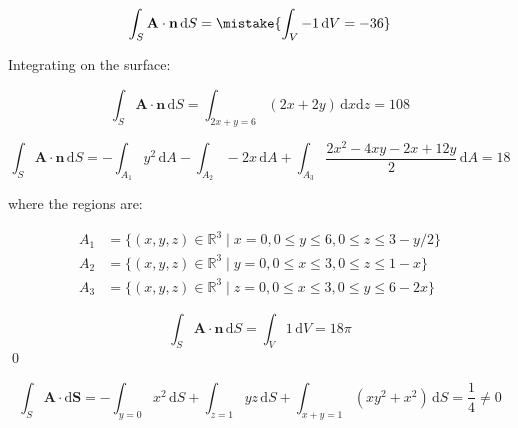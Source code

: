\documentclass[12pt]{article}
\begin{document}


\begin{equation}
    \int_{S} \mathbf{A} \cdot \mathbf{n} \, \mathrm{d}S = \mistake{\int_{V} -1 \, \mathrm{d}V = -36}
\end{equation}

\begin{correction}
    Integrating on the surface:

    \begin{equation}
        \int_{S} \mathbf{A} \cdot \mathbf{n} \, \mathrm{d}S = \int_{2x+y=6} (2x + 2y) \, \mathrm{d}x \mathrm{d}z = 108
    \end{equation}
\end{correction}


\begin{equation}
    \int_{S} \mathbf{A} \cdot \mathbf{n} \, \mathrm{d}S = -\int_{A_{1}} y^{2} \, \mathrm{d}A - \int_{A_{2}} -2x \, \mathrm{d}A + \int_{A_{3}} \frac{2x^{2} - 4xy - 2x + 12y}{2} \, \mathrm{d}A = 18
\end{equation}

where the regions are:

\begin{equation}
\begin{split}
    A_{1} &= \{(x, y, z) \in \mathbb{R}^{3} \mid x = 0, 0 \leq y \leq 6, 0 \leq z \leq 3 - y/2 \} \\
    A_{2} &= \{(x, y, z) \in \mathbb{R}^{3} \mid y = 0, 0 \leq x \leq 3, 0 \leq z \leq 1 - x \} \\
    A_{3} &= \{(x, y, z) \in \mathbb{R}^{3} \mid z = 0, 0 \leq x \leq 3, 0 \leq y \leq 6 - 2x \}
\end{split}
\end{equation}


\begin{equation}
    \int_{S} \mathbf{A} \cdot \mathbf{n} \, \mathrm{d}S = \int_{V} 1 \, \mathrm{d}V = 18 \pi
\end{equation}
\qed



\begin{equation}
    \int_{S} \mathbf{A} \cdot \mathrm{d}\mathbf{S} = -\int_{y=0} x^{2}  \, \mathrm{d}S + \int_{z=1} yz \, \mathrm{d}S + \int_{x+y=1} (xy^{2} + x^{2}) \, \mathrm{d}S = \frac{1}{4} \ne 0
\end{equation}
\end{document}

